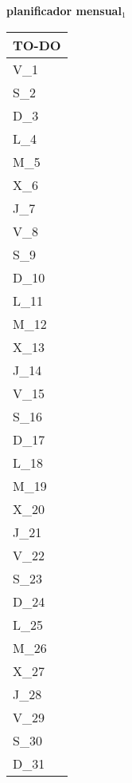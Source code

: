 \clearpage
{\raggedright
	\fontsize{25}{50}\selectfont
	\textbf{\NextYear}
}\scriptsize{\textbf{planificador mensual$_1$}}\\[11.3pt]



	\noindent\dotfill
	\renewcommand{\arraystretch}{1.5}\scriptsize
		\begin{longtabu} to \textwidth { X[l]}
		\centering \small{\textbf{TO-DO}} \\
		\toprule
		V_{1} \dotfill\\
		S_{2} \dotfill\\
		D_{3} \dotfill\\
		\hline
		L_{4} \dotfill\\
		M_{5} \dotfill\\
		X_{6} \dotfill\\
		J_{7} \dotfill\\
		V_{8} \dotfill\\
		S_{9} \dotfill\\
		D_{10} \dotfill\\
		\hline
		L_{11} \dotfill\\
		M_{12} \dotfill\\
		X_{13} \dotfill\\
		J_{14} \dotfill\\
		V_{15} \dotfill\\
		S_{16} \dotfill\\
		D_{17} \dotfill\\
		\hline
		L_{18} \dotfill\\
		M_{19} \dotfill\\
		X_{20} \dotfill\\
		J_{21} \dotfill\\
		V_{22} \dotfill\\
		S_{23} \dotfill\\
		D_{24} \dotfill\\
		\hline
		L_{25} \dotfill\\
		M_{26} \dotfill\\
		X_{27} \dotfill\\
		J_{28} \dotfill\\
		V_{29} \dotfill\\
		S_{30} \dotfill\\
		D_{31} \dotfill\\
		\hline

		\bottomrule

	\end{longtabu}


\clearpage
